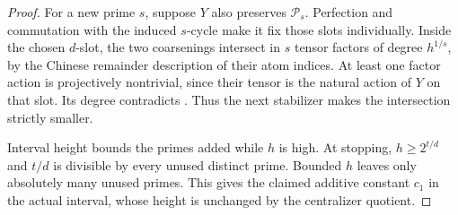 \begin{proof}
For a new prime $s$, suppose $Y$ also preserves $\mathcal P_s$.
Perfection and commutation with the induced $s$-cycle make it fix those
slots individually. Inside the chosen $d$-slot, the two coarsenings
intersect in $s$ tensor factors of degree $h^{1/s}$, by the Chinese
remainder description of their atom indices. At least one factor
action is projectively nontrivial, since their tensor is the natural
action of $Y$ on that slot. Its degree contradicts .
Thus the next stabilizer makes the intersection strictly smaller.

Interval height bounds the primes added while $h$ is high. At stopping,
$h\ge2^{t/d}$ and $t/d$ is divisible by every unused distinct prime.
Bounded $h$ leaves only absolutely many unused primes. This gives the
claimed additive constant $c_1$ in the actual interval, whose height is
unchanged by the centralizer quotient.
\end{proof}

